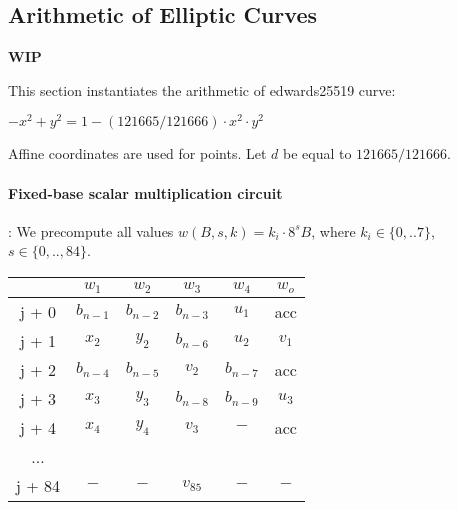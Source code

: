 \subsection{Arithmetic of Elliptic Curves} \label{ellcurve}
\textbf{WIP}

This section instantiates the arithmetic of edwards25519 curve:
\begin{center}
    $- x^2 + y^2 = 1 - (121665/121666) \cdot x^2 \cdot y^2$
\end{center}
Affine coordinates are used for points.
Let $d$ be equal to $121665/121666$.

\paragraph{Fixed-base scalar multiplication circuit}:
We precompute all values $w(B,s,k) = k_i \cdot 8^s B$, where $k_i \in \{ 0,..7 \}$, $s \in \{0,.., 84\}$.
\begin{center}
    \begin{tabular}{ c|c|c|c|c|c }
        & $w_1$       & $w_2$       & $w_3$       & $w_4$       & $w_o$ \\
        \hline
        j + 0  & $b_{n - 1}$ & $b_{n - 2}$ & $b_{n - 3}$ & $u_1$       & acc   \\
        j + 1  & $x_2$       & $y_2$       & $b_{n - 6}$ & $u_2$       & $v_1$ \\
        j + 2  & $b_{n - 4}$ & $b_{n - 5}$ & $v_2$       & $b_{n - 7}$ & acc   \\
        j + 3  & $x_3$       & $ y_3$      & $b_{n - 8}$ & $b_{n - 9}$ & $u_3$ \\
        j + 4  & $x_4$       & $y_4$       & $v_3$       & $-$         & acc   \\
        ...    &             &             &             &             &       \\
        j + 84 & $-$         & $-$         & $v_{85}$    & $-$         & $-$   \\
    \end{tabular}
\end{center}

